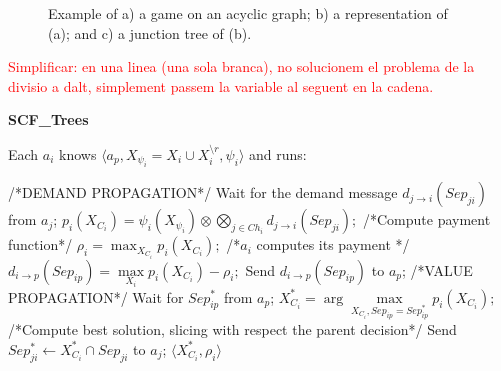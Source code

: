 \documentclass{article}
\begin{document}
\begin{figure}[!bt]
{\begin{center}
	\end{center}
	\label{fig:treedecomposition_line_graph}
}
\vspace{-0.2in}
\caption{ \label{fig:line_graph} Example of a) a game on an acyclic graph; b) a
representation of (a); and c) a junction tree of (b).}
\end{figure}


\textcolor{red}{Simplificar: en una linea (una sola branca), no solucionem el
problema de la divisio a dalt, simplement passem la variable al seguent en la
cadena.}

\begin{algorithm}[!tb]
\caption{\textbf{SCF\_Trees}} 
\small Each $a_i$ knows $\langle a_p, X_{\psi_i} = X_i \cup X^{\setminus
r}_i,\psi_i\rangle$ and runs:\normalsize
\small
 \begin{algorithmic}[1]
 	\STATE /*DEMAND PROPAGATION*/ 
        \STATE Wait for the demand message $d_{j \rightarrow i}(Sep_{ji})$ from
        $a_j$;
    \ENDFOR
     \STATE $p_i(X_{C_i}) =  \psi_i(X_{\psi_i}) \otimes \bigotimes_{j \in Ch_i}
     d_{j \rightarrow i}(Sep_{ji});$ /*Compute payment function*/
     \STATE $\rho_i = \max_{X_{C_i}} p_i(X_{C_i});$
     /*$a_i$ computes its payment */
    	\STATE $d_{i \rightarrow p}(Sep_{ip})= \max\limits_{X_i}
    	p_i(X_{C_i}) - \rho_i ;$ 
    	 \STATE Send $d_{i\rightarrow p}(Sep_{ip})$ to $a_p$;
    \ENDIF 
    \STATE /*VALUE PROPAGATION*/ 
  		\STATE  Wait for $Sep^*_{ip}$ from $a_p$;
    \ENDIF
     \STATE $X^*_{C_i} = \arg \max\limits_{X_{C_i}, Sep_{ip} = Sep^*_{ip} }
  	     p_i(X_{C_i});$ /*Compute best solution, slicing with respect the
  	     parent decision*/
        \STATE Send $Sep^*_{ji}\leftarrow X^*_{C_i}\cap Sep_{ji}$ to $a_j$;
    \ENDFOR
    \RETURN $\langle X^*_{C_i}, \rho_i \rangle$
\end{algorithmic}
\label{proc:scf_trees}
\vspace{-0.03in}
\end{algorithm}
\end{document}

